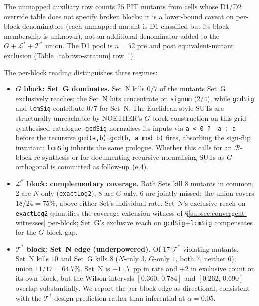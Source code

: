 \documentclass[acmsmall, screen]{acmart}
\begin{document}
The unmapped auxiliary row counts $25$ PIT mutants from cells whose D1/D2 override table does not specify broken blocks; it is a lower-bound caveat on per-block denominators (each unmapped mutant is D1-classified but its block membership is unknown), not an additional denominator added to the $G + \mathcal{L}^{*} + \mathcal{T}^{*}$ union. The D1 pool is $n = 52$ pre and post equivalent-mutant exclusion (Table~\ref{tab:two-stratum} row~1).

The per-block reading distinguishes three regimes:

\begin{itemize}[nosep,leftmargin=*]
\item \textbf{$G$ block: Set~G dominates.} Set~N kills $0/7$ of the mutants Set~G exclusively reaches; the Set~N hits concentrate on \texttt{signum} ($2/4$), while \texttt{gcdSig} and \texttt{lcmSig} contribute $0/7$ for Set~N. The Euclidean-style SUTs are structurally unreachable by NOETHER's $G$-block construction on this grid-synthesised catalogue: \texttt{gcdSig} normalises its inputs via \texttt{a < 0 ? -a : a} before the recursive \texttt{gcd(a,b)=gcd(b, a\,mod\,b)} fires, absorbing the sign-flip invariant; \texttt{lcmSig} inherits the same prologue. Whether this calls for an $\mathcal{R}$-block re-synthesis or for documenting recursive-normalising SUTs as $G$-orthogonal is committed as follow-up~(e.4).

\item \textbf{$\mathcal{L}^{*}$ block: complementary coverage.} Both Sets kill 8 mutants in common, 2 are $N$-only (\texttt{exactLog2}), 8 are $G$-only, 6 are jointly missed; the union covers $18/24 = 75\%$, above either Set's individual rate. Set~N's exclusive reach on \texttt{exactLog2} quantifies the coverage-extension witness of \S\ref{subsec:convergent-witnesses} per-block; Set~G's exclusive reach on \texttt{gcdSig}+\texttt{lcmSig} compensates for the $G$-block gap.

\item \textbf{$\mathcal{T}^{*}$ block: Set~N edge (underpowered).} Of $17$ $\mathcal{T}^{*}$-violating mutants, Set~N kills $10$ and Set~G kills $8$ ($N$-only $3$, $G$-only $1$, both $7$, neither $6$); union $11/17 = 64.7\%$. Set~N is $+11.7$~pp in rate and $+2$ in exclusive count on its own block, but the Wilson intervals $[0.360,\,0.784]$ and $[0.262,\,0.690]$ overlap substantially. We report the per-block edge as directional, consistent with the $\mathcal{T}^{*}$ design prediction rather than inferential at $\alpha = 0.05$.
\end{itemize}
\end{document}
